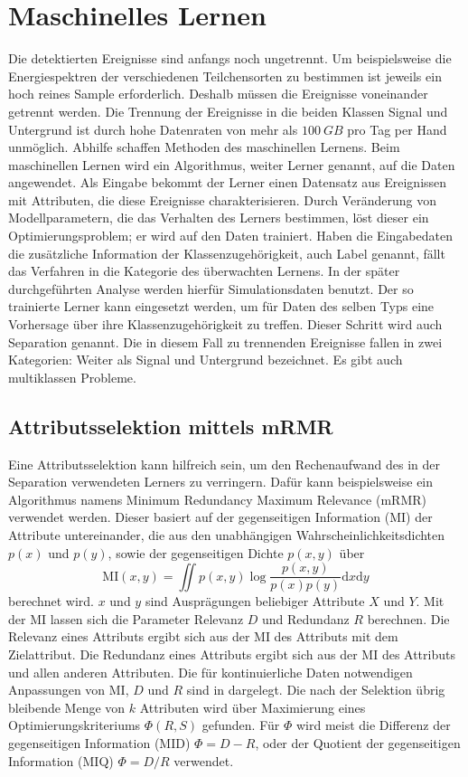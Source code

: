 \section{Maschinelles Lernen}
Die detektierten Ereignisse sind anfangs noch ungetrennt. 
Um beispielsweise die Energiespektren der verschiedenen Teilchensorten zu bestimmen ist jeweils ein hoch reines Sample erforderlich.
Deshalb müssen die Ereignisse voneinander getrennt werden.
Die Trennung der Ereignisse in die beiden Klassen Signal und Untergrund ist durch hohe Datenraten von mehr als $\SI{100}{GB}$ pro Tag per Hand unmöglich.
Abhilfe schaffen Methoden des maschinellen Lernens. 
Beim maschinellen Lernen wird ein Algorithmus, weiter Lerner genannt, auf die Daten angewendet. 
Als Eingabe bekommt der Lerner einen Datensatz aus Ereignissen mit Attributen, die diese Ereignisse charakterisieren. 
Durch Veränderung von Modellparametern, die das Verhalten des Lerners bestimmen, löst dieser ein Optimierungsproblem; er wird auf den Daten trainiert.
Haben die Eingabedaten die zusätzliche Information der Klassenzugehörigkeit, auch Label genannt, fällt das Verfahren in die Kategorie des überwachten Lernens. 
In der später durchgeführten Analyse werden hierfür Simulationsdaten benutzt.
Der so trainierte Lerner kann eingesetzt werden, um für Daten des selben Typs eine Vorhersage über ihre Klassenzugehörigkeit zu treffen.
Dieser Schritt wird auch Separation genannt. 
Die in diesem Fall zu trennenden Ereignisse fallen in zwei Kategorien: Weiter als Signal und Untergrund bezeichnet.
Es gibt auch multiklassen Probleme.
\cite{Aggarwal15}

\subsection*{Attributsselektion mittels mRMR}
\label{theo:mrmr}
Eine Attributsselektion kann hilfreich sein, um den Rechenaufwand des in der Separation verwendeten Lerners zu verringern.
Dafür kann beispielsweise ein Algorithmus namens Minimum Redundancy Maximum Relevance (mRMR) verwendet werden.
Dieser basiert auf der gegenseitigen Information ($\text{MI}$) der Attribute untereinander, die aus den unabhängigen Wahrscheinlichkeitsdichten $p(x)$ und $p(y)$, sowie der gegenseitigen Dichte $p(x,y)$ über
\begin{equation}
    \text{MI}(x,y) = \iint p(x,y) \log \frac{p(x,y)}{p(x)p(y)} \mathup{d}x\mathup{d}y 
    \label{mututal information}
\end{equation}
berechnet wird. $x$ und $y$ sind Ausprägungen beliebiger Attribute $X$ und $Y$.
Mit der $\text{MI}$ lassen sich die Parameter Relevanz $D$ und Redundanz $R$ berechnen.
Die Relevanz eines Attributs ergibt sich aus der $\text{MI}$ des Attributs mit dem Zielattribut. 
Die Redundanz eines Attributs ergibt sich aus der $\text{MI}$ des Attributs und allen anderen Attributen.
Die für kontinuierliche Daten notwendigen Anpassungen von $\text{MI}$, $D$ und $R$ sind in \cite{mrmrNumerisch} dargelegt.
Die nach der Selektion übrig bleibende Menge von $k$ Attributen wird über Maximierung eines Optimierungskriteriums $Φ(R,S)$ gefunden.
Für $Φ$ wird meist die Differenz der gegenseitigen Information (MID) $Φ = D-R$, oder der Quotient der gegenseitigen Information (MIQ) $Φ = D/R $ verwendet.

